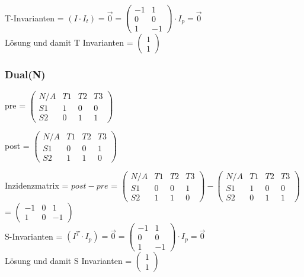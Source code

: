 \documentclass[10pt]{scrartcl}
\begin{document}
		T-Invarianten = $(I \cdotp I_t) = \overrightarrow{0} = \begin{pmatrix} 
						 -1 & 1 \\
						 0 & 0 \\
						 1 & -1 \end{pmatrix} \cdotp I_p = \overrightarrow{0}$\\
		
		Lösung und damit T Invarianten = $\begin{pmatrix} 
						 1 \\
						 1\end{pmatrix}$\\

	
		\subsubsection{Dual(N)}
		
		pre =
		$\begin{pmatrix} N/A & T1 & T2 & T3\\
						 S1 & 1 & 0 & 0 \\
						 S2 & 0 & 1 & 1\end{pmatrix}$  
						 
		post =
		$\begin{pmatrix} N/A & T1 & T2 & T3\\
						 S1 & 0 & 0 & 1 \\
						 S2 & 1 & 1 & 0\end{pmatrix}$ 
						 
						 
		Inzidenzmatrix = $post - pre$ = $\begin{pmatrix} N/A & T1 & T2 & T3\\
						 S1 & 0 & 0 & 1 \\
						 S2 & 1 & 1 & 0\end{pmatrix}  - \begin{pmatrix} N/A & T1 & T2 & T3\\
						 S1 & 1 & 0 & 0 \\
						 S2 & 0 & 1 & 1\end{pmatrix}$  = $\begin{pmatrix} 
						 -1 & 0 & 1 \\
						 1 & 0 & -1 \end{pmatrix}$
		\\S-Invarianten = $(I^T \cdotp I_p) = \overrightarrow{0} = \begin{pmatrix} 
						 -1 & 1\\
						 0 & 0\\
						 1 & -1 \end{pmatrix} \cdotp I_p = \overrightarrow{0}$\\ 
		Lösung und damit S Invarianten = $\begin{pmatrix} 
						 1 \\
						 1\end{pmatrix}$\\
						 
\end{document}
